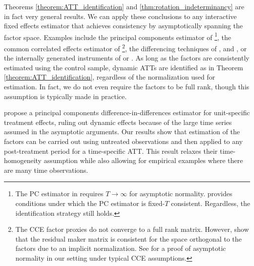 \documentclass[12pt]{article}
\begin{document}
Theorems \ref{theorem:ATT_identification} and \ref{thm:rotation_indeterminancy} are in fact very general results. We can apply these conclusions to any interactive fixed effects estimator that achieves consistency by asymptotically spanning the factor space. Examples include the principal components estimator of \citet{Bai_2009}\footnote{The PC estimator in \citet{Bai_2009} requires $T \rightarrow \infty$ for asymptotic normality. \citet{Westerlund_2020} provides conditions under which the PC estimator is fixed-$T$ consistent. Regardless, the identification strategy still holds.}, the common correlated effects estimator of \citet{Pesaran_2006}\footnote{The CCE factor proxies do not converge to a full rank matrix. However, \citet{Westerlund_Petrova_Norkute_2019} show that the residual maker matrix is consistent for the space orthogonal to the factors due to an implicit normalization. See \citet{Brown_Butts_Westerlund_2023} for a proof of asymptotic normality in our setting under typical CCE assumptions.}, the differencing techniques of \citet{Ahn_Lee_Schmidt_2001,Ahn_Lee_Schmidt_2013}, \citet{Callaway_Karami_2020} and \citet{Brown_2022}, or the internally generated instruments of \citet{Juodis_Sarafidis_2020} or \citet{Cui_et_al_2022}. As long as the factors are consistently estimated using the control sample, dynamic ATTs are identified as in Theorem \ref{theorem:ATT_identification}, regardless of the normalization used for estimation. In fact, we do not even require the factors to be full rank, though this assumption is typically made in practice. 

\citet{Chan_and_Kwok_2022} propose a principal components difference-in-differences estimator for unit-specific treatment effects, ruling out dynamic effects because of the large time series assumed in the asymptotic arguments. Our results show that estimation of the factors can be carried out using untreated observations and then applied to any post-treatment period for a time-specific ATT. This result relaxes their time-homogeneity assumption while also allowing for empirical examples where there are many time observations.
\end{document}
